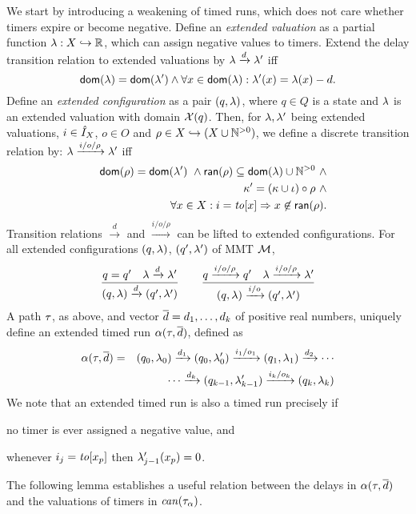 We start by introducing a weakening of timed runs, which does not care
whether timers expire or become negative. Define an \emph{extended valuation}
as a partial function $\lambda : X \hookrightarrow {\mathbb R}$, which can assign
negative values to timers. 
Extend the delay transition relation to extended valuations by
$\lambda \xrightarrow{d} \lambda'$ iff
\[
{\textsf{dom}}(\lambda) = {\textsf{dom}}(\lambda') \wedge \forall x \in{\textsf{dom}}(\lambda) : \lambda'(x) = \lambda(x) - d .
\]
Define an \emph{extended configuration} as a pair $(q,\lambda)$, where $q \in Q$ is a state and $\lambda$ is an extended valuation with domain $\mathcal{X}(q)$.
Then, for $\lambda, \lambda'$ being extended valuations, $i \in \hat{I}_{X}$, $o \in O$ and $\rho \in X \hookrightarrow (X \cup {\mathbb N}^{>0})$,
we define a discrete transition relation by: $\lambda \xrightarrow{i/o/\rho}  \lambda'$ iff
\begin{eqnarray*}
&& {\textsf{dom}}(\rho) = {\textsf{dom}}(\lambda') ~ \wedge {\textsf{ran}}(\rho) \subseteq {\textsf{dom}}(\lambda) \cup {\mathbb N}^{>0} ~ \wedge\\
  &&\kappa' = (\kappa \cup \iota) \circ \rho ~ \wedge
  \\
  && \forall x \in X : i=\mathit{to}[x] \Rightarrow x \not\in {\textsf{ran}}(\rho).
\end{eqnarray*}
Transition relations $\xrightarrow{d}$ and $\xrightarrow{i/o/\rho}$ can be lifted to extended configurations.
For all extended configurations $(q, \lambda)$, $(q', \lambda')$ of MMT ${\mathcal M}$,
\[
\frac{q = q' \quad \lambda \xrightarrow{d} \lambda'}{(q,\lambda) \xrightarrow{d} (q',\lambda')}
\quad\quad
  \frac{q \xrightarrow{i/o/\rho} q' \quad \lambda \xrightarrow{i/o/\rho} \lambda'}{(q,\lambda) \xrightarrow{i/o} (q',\lambda')}
\]
A path $\tau$, as above, and vector $\overline{d} = d_1, \ldots, d_k$ of positive real numbers, uniquely define an extended timed run
$\alpha(\tau,\overline{d})$, defined as
  \begin{eqnarray*}
\alpha(\tau,\overline{d}) & = & (q_0,\lambda_0) \xrightarrow{d_1} (q_0,\lambda_0') \xrightarrow{i_1/o_1} (q_1,\lambda_1) \xrightarrow{d_2} 
\cdots
\\ && \qquad \cdots
\xrightarrow{d_k} (q_{k-1},\lambda_{k-1}') \xrightarrow{i_k/o_k} (q_k,\lambda_k)
\end{eqnarray*}
  We note that an extended timed run is also a timed run precisely if
  \begin{inparaenum}[(i)]
  \item no timer is ever assigned a negative value, and
  \item whenever $i_j = \mathit{to}[x_p]$ then $\lambda_{j-1}'(x_p) = 0$.
  \end{inparaenum}
  The following lemma establishes a useful relation between the delays in
  $\alpha(\tau,\overline{d})$
and the valuations of timers in $\mathit{can}({\tau_{\alpha}})$.

